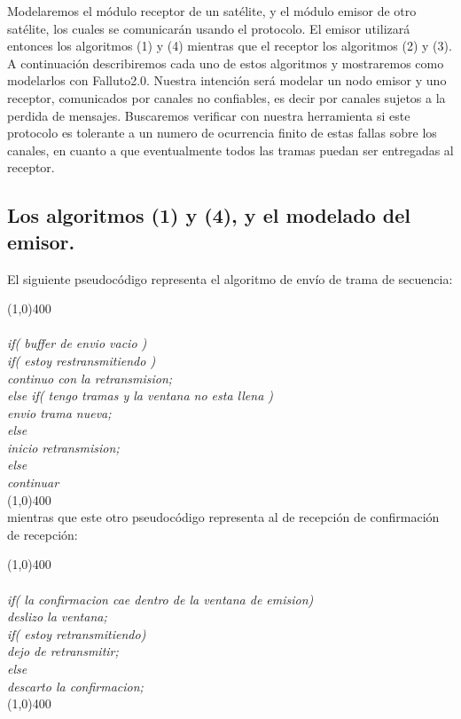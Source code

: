 \documentclass[titlepage, 12pt]{book}
\begin{document}
Modelaremos el m\'odulo receptor de un sat\'elite, y el m\'odulo emisor de otro sat\'elite, los cuales se comunicar\'an usando el protocolo. El emisor utilizar\'a entonces los algoritmos (1) y (4) mientras que el receptor los algoritmos (2) y (3). A continuaci\'on describiremos cada uno de estos algoritmos y mostraremos como modelarlos con Falluto2.0. Nuestra intenci\'on ser\'a modelar un nodo emisor y uno receptor, comunicados por canales no confiables, es decir por canales sujetos a la perdida de mensajes. Buscaremos verificar con nuestra herramienta si este protocolo es tolerante a un numero de ocurrencia finito de estas fallas sobre los canales, en cuanto a que eventualmente todos las tramas puedan ser entregadas al receptor.


\subsection*{Los algoritmos (1) y (4), y el modelado del emisor.}


El siguiente pseudoc\'odigo representa el algoritmo de env\'io de trama de secuencia:

\noindent \line(1,0){400}
\textit{\\\\
\noindent if( buffer de envio vacio )\\
\indent if( estoy restransmitiendo )\\
\indent \indent continuo con la retransmision;\\
\indent else if( tengo tramas y la ventana no esta llena )\\
\indent \indent envio trama nueva;\\
\indent else \\
\indent \indent inicio retransmision;\\
\noindent else \\
\indent continuar \\		
}
\noindent \line(1,0){400}\\

mientras que este otro pseudoc\'odigo representa al de recepci\'on de confirmaci\'on de recepci\'on:

\noindent \line(1,0){400}
\textit{\\\\
if( la confirmacion cae dentro de la ventana de emision)\\
\indent    deslizo la ventana;\\
\indent    if( estoy retransmitiendo)\\
\indent \indent dejo de retransmitir;\\
else\\
\indent descarto la confirmacion;\\
}
\noindent \line(1,0){400}\\
\end{document}
